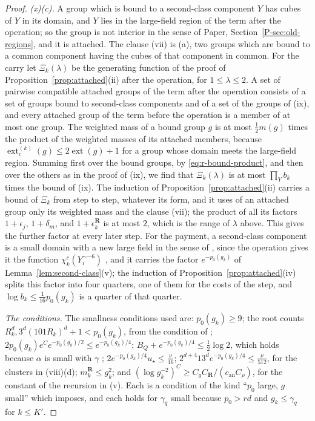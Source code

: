\documentclass[11pt]{preprint}
\numberwithin{equation}{section}
\theoremstyle{definition}
\theoremstyle{remark}
\theoremstyle{plain}
\begin{document}
\begin{proof}
\emph{(x)(c).} A group which is bound to a second-class component $Y$ has cubes of $Y$ in its domain, and $Y$ lies in the large-field region of the term after the operation; so the group is not interior in the sense of Paper, Section~\ref{P-sec:old-regions}, and it is attached. The clause (vii) is (a), two groups which are bound to a common component having the cubes of that component in common. For the carry let $\Xi_k(\lambda)$ be the generating function of the proof of Proposition~\ref{prop:attached}(ii) after the operation, for $1 \leq \lambda \leq 2$. A set of pairwise compatible attached groups of the term after the operation consists of a set of groups bound to second-class components and of a set of the groups of (ix), and every attached group of the term before the operation is a member of at most one group. The weighted mass of a bound group $g$ is at most $\frac12m(g)$ times the product of the weighted masses of its attached members, because $\operatorname{ext}^{(k)}_{\mathrm c}(g) \leq 2\operatorname{ext}(g) + 1$ for a group whose domain meets the large-field region. Summing first over the bound groups, by \eqref{eq:r-bound-product}, and then over the others as in the proof of (ix), we find that $\Xi_k(\lambda)$ is at most $\prod_Yb_k$ times the bound of (ix). The induction of Proposition~\ref{prop:attached}(ii) carries a bound of $\Xi_k$ from step to step, whatever its form, and it uses of an attached group only its weighted mass and the clause (vii); the product of all its factors $1 + \epsilon_j$, $1 + \delta_m$, and $1 + \epsilon^{\mathbf R}_k$ is at most $2$, which is the range of $\lambda$ above. This gives the further factor at every later step. For the payment, a second-class component is a small domain with a new large field in the sense of \cite[pp.~385--386]{BalabanLFR2}, since the operation gives it the function $\chi^c_k(Y_i^{\sim-6})$ \cite[p.~378]{BalabanLFR2}, and it carries the factor $e^{-p_0(g_k)}$ of Lemma~\ref{lem:second-class}(v); the induction of Proposition~\ref{prop:attached}(iv) splits this factor into four quarters, one of them for the costs of the step, and $\log b_k \leq \frac{1}{16}p_0(g_k)$ is a quarter of that quarter.

\emph{The conditions.} The smallness conditions used are: $p_0(g_k) \geq 9$; the root counts $R_k^d, 3^d(101R_k)^d + 1 < p_0(g_k)$, from the condition of \cite[p.~389]{BalabanLFR2}; $2p_0(g_k)e^Ce^{-p_0(g_k)/2} \leq e^{-p_0(g_k)/4}$; $B_Q + e^{-p_0(g_k)/4} \leq \frac12\log 2$, which holds because $\alpha$ is small with $\gamma$ \cite[p.~377]{BalabanLFR2}; $2e^{-p_0(g_k)/4}u_\star \leq \frac{\nu}{16}$; $2^{d+4}13^de^{-p_0(g_k)/4} \leq \frac{\nu}{512}$, for the clusters in (viii)(d); $m^{\mathbf R}_k \leq g_k^2$; and $(\log g_k^{-2})^C \geq C_gC_{\mathbf R}/(c_{\mathrm{an}}C_\rho)$, for the constant of the recursion in (v). Each is a condition of the kind ``$p_0$ large, $g$ small'' which \cite[pp.~385, 389]{BalabanLFR2} imposes, and each holds for $\gamma_q$ small because $p_0 > rd$ and $g_k \leq \gamma_q$ for $k \leq K'$.
\end{proof}
\end{document}
